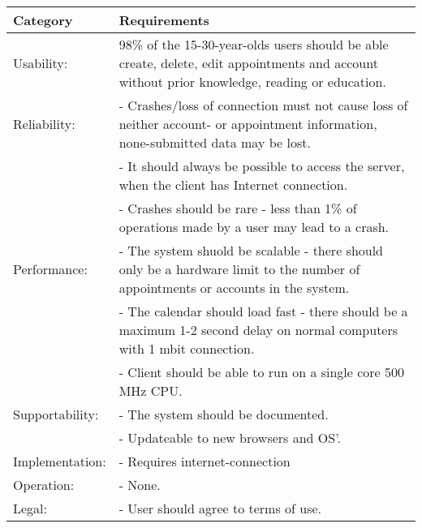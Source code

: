 {\tabulinesep=1.2mm
\begin{tabu}{ | p{3cm} | p{13cm} |}
    \hline
    Category	 			& 		Requirements \\\hline
    Usability:	  			& 		98\% of the 15-30-year-olds users should be able create, delete, edit appointments and account without prior knowledge, reading or education. \\\hline
    Reliability: 			& 		- Crashes/loss of connection must not cause loss of neither account- or appointment information, none-submitted data may be lost. \\
							&		- It should always be possible to access the server, when the client has Internet connection.\\
							&		- Crashes should be rare - less than 1\% of operations made by a user may lead to a crash. \\ \hline
	Performance:			&		- The system shuold be scalable - there should only be a hardware limit to the number of appointments or accounts in the system.\\
							&		- The calendar should load fast - there should be a maximum 1-2 second delay on normal computers with 1 mbit connection.\\
							&		- Client should be able to run on a single core 500 MHz CPU.\\ \hline
    Supportability: 		& 		- The system should be documented.  \\
    						&		- Updateable to new browsers and OS'. \\ \hline
	Implementation: 		&		- Requires internet-connection\\\hline
	Operation:				&	 	- None. \\\hline
	Legal:					&		- User should agree to terms of use.\\
\end{tabu}
}